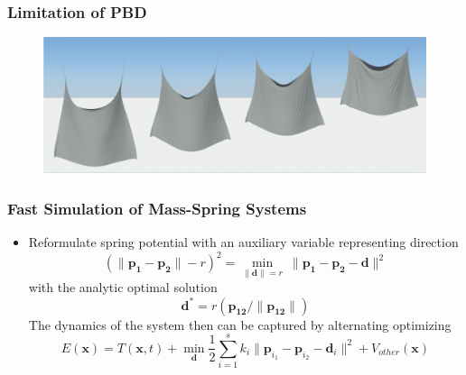 \documentclass[serif,mathserif]{beamer}
\begin{document}
\begin{frame}
 \frametitle{Limitation of PBD}
 \begin{figure}[t]
  \centering
  \includegraphics[scale=0.25]{pic/pbd_artifact.png}
 \end{figure}
\end{frame}


\begin{frame}
  \frametitle{Fast Simulation of Mass-Spring Systems}
  \begin{itemize}
   \item Reformulate spring potential with an auxiliary variable representing direction
    \begin{equation*}
     (\|\mathbf{p_1}-\mathbf{p_2}\|-r)^2=\underset{\|\mathbf{d}\|=r}\min~\|\mathbf{p_1}-\mathbf{p_2}-\mathbf{d}\|^2
    \end{equation*}
   with the analytic optimal solution
   \begin{equation*}
    \mathbf{d}^* = r(\mathbf{p_{12}}/\|\mathbf{p_{12}}\|)
   \end{equation*}
  The dynamics of the system then can be captured by alternating optimizing
  \begin{equation*}
   E(\mathbf{x}) = T(\mathbf{x},t)+\min_{\mathbf{d}}\frac{1}{2}\sum_{i=1}^s k_i\|\mathbf{p}_{i_1}-\mathbf{p}_{i_2}-\mathbf{d}_i\|^2+V_{other}(\mathbf{x})
  \end{equation*}
  \end{itemize}
\end{frame}
\end{document}
